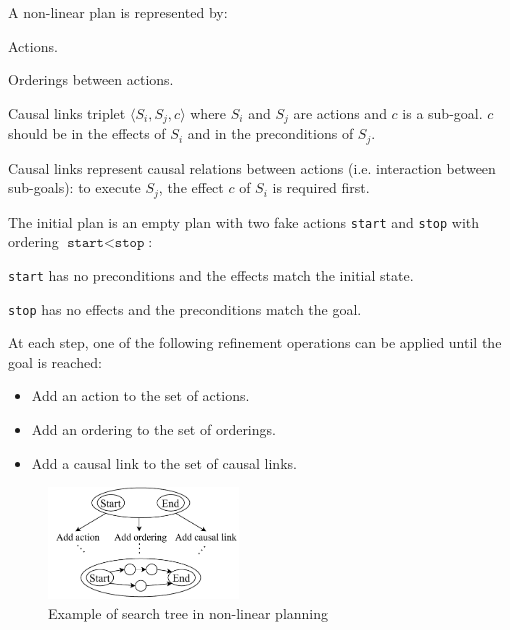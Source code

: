 A non-linear plan is represented by:
\begin{descriptionlist}
    \item[Actions{\normalfont.}] 
    \item[Orderings] 
        between actions.
    \item[Causal links] 
        triplet $\langle S_i, S_j, c \rangle$ where $S_i$ and $S_j$ are actions and $c$ is a sub-goal.
        $c$ should be in the effects of $S_i$ and in the preconditions of $S_j$.

        Causal links represent causal relations between actions (i.e. interaction between sub-goals): 
        to execute $S_j$, the effect $c$ of $S_i$ is required first.
\end{descriptionlist}

The initial plan is an empty plan with two fake actions \texttt{start} and \texttt{stop} 
with ordering $\texttt{start} < \texttt{stop}$:
\begin{descriptionlist}
    \item[\texttt{start}] has no preconditions and the effects match the initial state.
    \item[\texttt{stop}] has no effects and the preconditions match the goal.
\end{descriptionlist}
At each step, one of the following refinement operations can be applied until the goal is reached:
\begin{itemize}
    \item Add an action to the set of actions.
    \item Add an ordering to the set of orderings.
    \item Add a causal link to the set of causal links.
\end{itemize}

\begin{figure}[h]
    \centering
    \includegraphics[width=0.45\textwidth]{img/_nonlinear_plan_example.pdf}
    \caption{Example of search tree in non-linear planning}
\end{figure}


